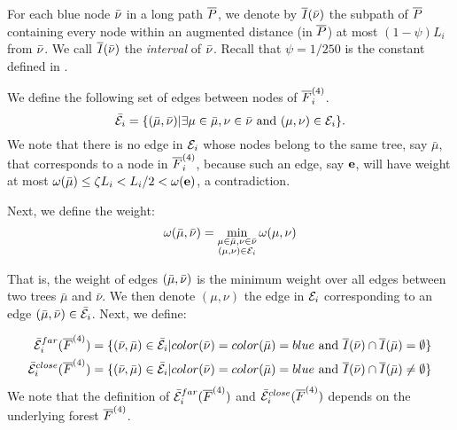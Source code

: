 For each blue node $\bar\nu$ in a long path $\overline{P}$, we denote by $\overline{I}(\bar\nu)$ the subpath of $\overline{P}$ containing every node  within an augmented distance (in $\overline{P}$) at most $(1-\psi)L_i$ from $\bar\nu$. We call $\overline{I}(\bar\nu)$ the \emph{interval} of $\bar\nu$. Recall that $\psi = 1/250$ is the constant defined in . 

We define the following set of edges between nodes of $\overline{F}^{(4)}_i$.
	\begin{equation}\label{eq:Ebar-i}
		\bar{\mathcal{E}}_i = \{(\bar\mu,\bar\nu) | \exists \mu \in \bar{\mu}, \nu \in \bar{\nu} \mbox{ and }(\mu,\nu)\in \mathcal{E}_i\}.
	\end{equation}
We note that there is no edge in $\mathcal{E}_i$ whose nodes belong to the same tree, say $\bar{\mu}$, that corresponds to a node in $\overline{F}^{(4)}_i$, because such an edge, say $\mathbf{e}$, will have weight at most  $\omega(\bar{\mu}) \leq \zeta L_i < L_i/2 < \omega(\mathbf{e})$, a contradiction. 

Next, we define the weight: 
\begin{equation}\label{eq:Ebar-weight}
	\omega(\bar\mu,\bar\nu) = \min_{\substack{\mu\in\bar{\mu}, \nu\in\bar{\nu}\\(\mu,\nu)\in \mathcal{E}_i}}\omega(\mu,\nu)
\end{equation}

That is, the weight of edges $(\bar\mu,\bar\nu)$ is the minimum weight over all edges between two trees $\bar{\mu}$ and $\bar{\nu}$. We then denote $(\mu,\nu)$ the edge in $\mathcal{E}_i$ corresponding to an edge $(\bar\mu,\bar\nu) \in \bar{\mathcal{E}}_i$. Next, we define:


\begin{equation}\label{eq:Ebar-farclose}
	\begin{split}	
		\bar{\mathcal{E}}^{far}_i(\overline{F}^{(4)}) &= \{(\bar\nu,\bar\mu) \in \bar{\mathcal{E}}_i | color(\bar\nu) = color({\bar\mu}) = blue  \mbox{ and }\overline{I}(\bar\nu)\cap \overline{I}(\bar\mu) = \emptyset\}\\
		\bar{\mathcal{E}}^{close}_i(\overline{F}^{(4)})  &= \{(\bar\nu,\bar\mu) \in \bar{\mathcal{E}}_i | color(\bar\nu) = color({\bar\mu}) = blue  \mbox{ and }\overline{I}(\bar\nu)\cap \overline{I}(\bar\mu)\not= \emptyset\}
	\end{split}
\end{equation}
We note that the definition of $\bar{\mathcal{E}}^{far}_i(\overline{F}^{(4)})$ and $\bar{\mathcal{E}}^{close}_i(\overline{F}^{(4)})$ depends on the underlying forest $\overline{F}^{(4)}$.



